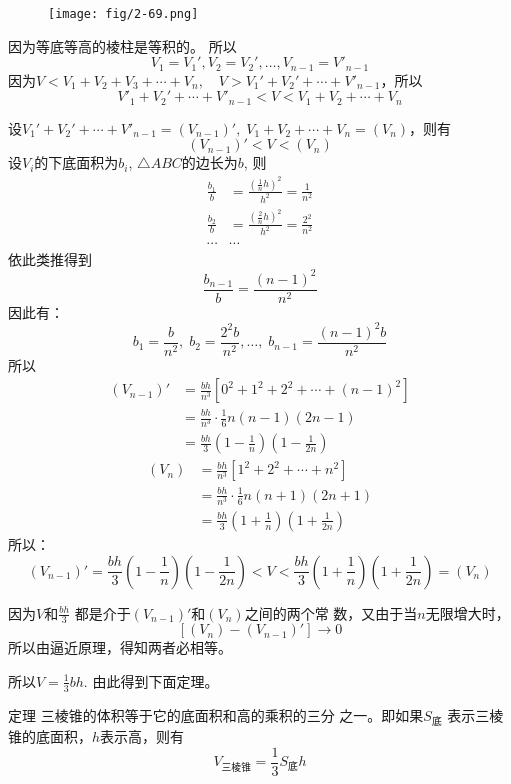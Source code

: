 \begin{figure}[htp]
    \centering
\texttt{[image: fig/2-69.png]}
    \caption{}
\end{figure}


因为等底等高的棱柱是等积的。
所以
\[V_1=V_1',V_2=V_2',\ldots, V_{n-1}=V'_{n-1}\]
因为$V<V_1+V_2+V_3+\cdots+V_n,\quad V>V_1'+V_2'+\cdots+V'_{n-1}$，所以\[V'_1+V_2'+\cdots+V'_{n-1}<V<V_1+V_2+\cdots+V_n\]

设$V_1'+V_2'+\cdots+V'_{n-1}=(V_{n-1})',\; V_1+V_2+\cdots+V_n=(V_n)$，则有
\[(V_{n-1})'<V<(V_n)\]
设$V_i$的下底面积为$b_i$, $\triangle ABC$的边长为$b$, 则
\[\begin{split}
    \frac{b_1}{b}&=\frac{\left(\frac{1}{n}h\right)^2}{h^2}=\frac{1}{n^2}\\
    \frac{b_2}{b}&=\frac{\left(\frac{2}{n}h\right)^2}{h^2}=\frac{2^2}{n^2}\\
\cdots&\cdots
\end{split}\]
依此类推得到
\[\frac{b_{n-1}}{b}=\frac{(n-1)^2}{n^2}\]
因此有：
\[b_1=\frac{b}{n^2},\; b_2=\frac{2^2 b}{n^2},\ldots, \; b_{n-1}=\frac{(n-1)^2 b}{n^2}\]
所以
\[\begin{split}
    (V_{n-1})'&=\frac{bh}{n^3}\left[0^2+1^2+2^2+\cdots+(n-1)^2\right]\\
    &=\frac{bh}{n^3}\cdot \frac{1}{6}n(n-1)(2n-1)\\
    &=\frac{bh}{3}\left(1-\frac{1}{n}\right)\left(1-\frac{1}{2n}\right)
\end{split} \]
\[\begin{split}
    (V_{n})&=\frac{bh}{n^3}\left[1^2+2^2+\cdots+n^2\right]\\
    &=\frac{bh}{n^3}\cdot \frac{1}{6}n(n+1)(2n+1)\\
    &=\frac{bh}{3}\left(1+\frac{1}{n}\right)\left(1+\frac{1}{2n}\right)
\end{split} \]
所以：
\[ (V_{n-1})'=\frac{bh}{3}\left(1-\frac{1}{n}\right)\left(1-\frac{1}{2n}\right)<V<\frac{bh}{3}\left(1+\frac{1}{n}\right)\left(1+\frac{1}{2n}\right)=(V_{n})\]

因为$V$和$\frac{bh}{3}$
都是介于$(V_{n-1})'$和$(V_n)$之间的两个常
数，又由于当$n$无限增大时，
\[[(V_n)-(V_{n-1})'] \to 0\]
所以由逼近原理，得知两者必相等。

所以$V=\frac{1}{3}bh$. 由此得到下面定理。

\begin{blk}
    {定理} 三棱锥的体积等于它的底面积和高的乘积的三分
之一。即如果$S_{\text{底}}$ 表示三棱锥的底面积，$h$表示高，则有
\[V_{\text{三棱锥}}=\frac{1}{3}S_{\text{底}}h\]
\end{blk}

